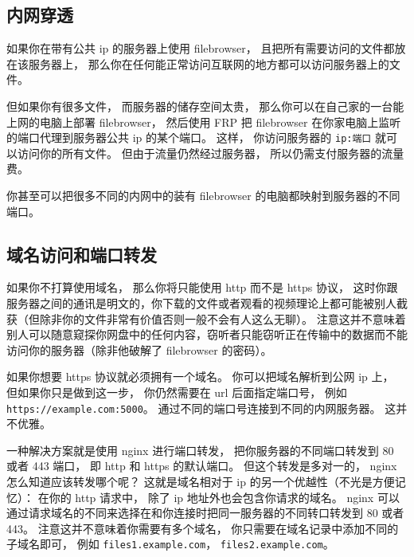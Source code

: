 \subsection{内网穿透}

如果你在带有公共 ip 的服务器上使用 filebrowser， 且把所有需要访问的文件都放在该服务器上， 那么你在任何能正常访问互联网的地方都可以访问服务器上的文件。

但如果你有很多文件， 而服务器的储存空间太贵， 那么你可以在自己家的一台能上网的电脑上部署 filebrowser， 然后使用 FRP 把 filebrowser 在你家电脑上监听的端口代理到服务器公共 ip 的某个端口。 这样， 你访问服务器的 \verb|ip:端口| 就可以访问你的所有文件。 但由于流量仍然经过服务器， 所以仍需支付服务器的流量费。

你甚至可以把很多不同的内网中的装有 filebrowser 的电脑都映射到服务器的不同端口。

\subsection{域名访问和端口转发}

如果你不打算使用域名， 那么你将只能使用 http 而不是 https 协议， 这时你跟服务器之间的通讯是明文的，你下载的文件或者观看的视频理论上都可能被别人截获（但除非你的文件非常有价值否则一般不会有人这么无聊）。 注意这并不意味着别人可以随意窥探你网盘中的任何内容，窃听者只能窃听正在传输中的数据而不能访问你的服务器（除非他破解了 filebrowser 的密码）。

如果你想要 https 协议就必须拥有一个域名。 你可以把域名解析到公网 ip 上， 但如果你只是做到这一步， 你仍然需要在 url 后面指定端口号， 例如 \verb|https://example.com:5000|。 通过不同的端口号连接到不同的内网服务器。 这并不优雅。

一种解决方案就是使用 nginx 进行端口转发， 把你服务器的不同端口转发到 80 或者 443 端口， 即 http 和 https 的默认端口。 但这个转发是多对一的， nginx 怎么知道应该转发哪个呢？ 这就是域名相对于 ip 的另一个优越性（不光是方便记忆）： 在你的 http 请求中， 除了 ip 地址外也会包含你请求的域名。 nginx 可以通过请求域名的不同来选择在和你连接时把同一服务器的不同转口转发到 80 或者 443。 注意这并不意味着你需要有多个域名， 你只需要在域名记录中添加不同的子域名即可， 例如 \verb|files1.example.com|， \verb|files2.example.com|。

